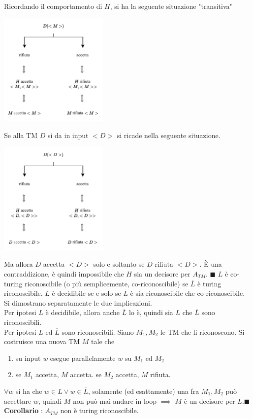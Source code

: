\documentclass[10pt, letterpaper]{report}
\begin{document}
Ricordando il comportamento di $H$, si ha la seguente situazione "transitiva"
\begin{center}
    \includegraphics[width=0.4\textwidth ]{images/ATMnonDec.pdf}
\end{center}
Se alla TM $D$ si da in input $<D>$ si ricade nella seguente situazione.
\begin{center}
    \includegraphics[width=0.4\textwidth ]{images/ATMnonDec2.pdf}
\end{center}
Ma allora $D$ accetta $<D>$ solo e soltanto se $D$ rifiuta $<D>$. È una  contraddizione, è quindi impossibile che $H$ sia un decisore per $A_{TM}$.
\hfill$\blacksquare$\acc 
{} $L$ è co-turing riconoscibile (o più semplicemente, co-riconoscibile) se $\overline{L}$ è turing riconoscibile.\acc 
\teo{} $L$ è decidibile se e solo se $L$ è sia riconoscibile che co-riconoscibile.\acc 
\dimo{} Si dimostrano separatamente le due implicazioni. \\ 
\boxedMath{$\implies$} Per ipotesi $L$ è decidibile, allora anche $\overline{L}$ lo è, quindi sia $L$ che $\overline{L}$ sono riconoscibili. \\ 
\boxedMath{$\impliedby$} Per ipotesi $L$ ed $\overline{L}$ sono riconoscibili. Siano $M_1,M_2$ le TM che li riconoscono. Si costruisce una nuova TM $M$ tale che \begin{enumerate}
    \item su input $w$ esegue parallelamente $w$ su $M_1$ ed $M_2$
    \item se $M_1$ accetta, $M$ accetta. se $M_2$ accetta, $M$ rifiuta.
\end{enumerate}
$\forall w$ si ha che $w\in L \lor w\in \overline{L}$, solamente (ed esattamente) una fra $M_1,M_2$ può accettare $w$, quindi $M$ non può mai andare in loop $\implies$ $M$ è un decisore per $L$.\hfill$\blacksquare$\acc 
\textbf{Corollario} : $\overline{A_{TM}}$ non è turing riconoscibile.\flowerLine 
\end{document}
